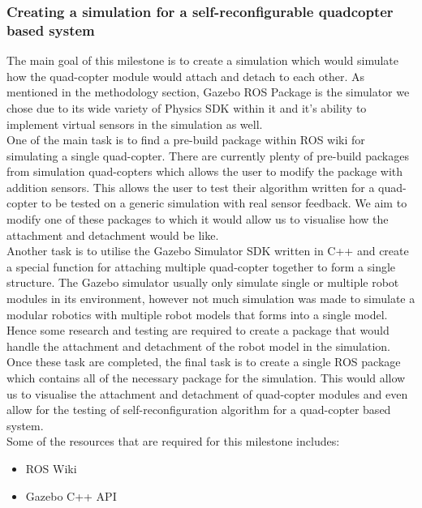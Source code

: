 \documentclass[12pt,A4]{article}
\begin{document}
	\subsubsection{Creating a simulation for a self-reconfigurable quadcopter based system}
	
	The main goal of this milestone is to create a simulation which would simulate how the quad-copter module would attach and detach to each other. As mentioned in the methodology section, Gazebo ROS Package is the simulator we chose due to its wide variety of Physics SDK within it and it's ability to implement virtual sensors in the simulation as well. \\
	
	One of the main task is to find a pre-build package within ROS wiki for simulating a single quad-copter. There are currently plenty of pre-build packages from simulation quad-copters which allows the user to modify the package with addition sensors. This allows the user to test their algorithm written for a quad-copter to be tested on a generic simulation with real sensor feedback. We aim to modify one of these packages to which it would allow us to visualise how the attachment and detachment would be like. \\
	
	Another task is to utilise the Gazebo Simulator SDK written in C++ and create a special function for attaching multiple quad-copter together to form a single structure. The Gazebo simulator usually only simulate single or multiple robot modules in its environment, however not much simulation was made to simulate a modular robotics with multiple robot models that forms into a single model. Hence some research and testing are required to create a package that would handle the attachment and detachment of the robot model in the simulation.\\
	
	Once these task are completed, the final task is to create a single ROS package which contains all of the necessary package for the simulation. This would allow us to visualise the attachment and detachment of quad-copter modules and even allow for the testing of self-reconfiguration algorithm for a quad-copter based system.\\
	
	Some of the resources that are required for this milestone includes:
	\begin{itemize}
		\item ROS Wiki
		\item Gazebo C++ API
	\end{itemize}
	
\end{document}
